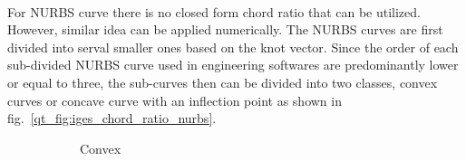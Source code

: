 \paragraph{}
For NURBS curve there is no closed form chord ratio that can be utilized.
However, similar idea can be applied numerically.
The NURBS curves are first divided into serval smaller ones based on the knot vector.  %
Since the order of each sub-divided NURBS curve used in engineering softwares are predominantly lower or equal to three, the sub-curves then can be divided into two classes, convex curves or concave curve with an inflection point as shown in fig.~\ref{qt_fig:iges_chord_ratio_nurbs}.
    \begin{figure}
        \begin{subfigure}[b]{0.5\linewidth}
            \centering
            \caption{Convex}
        \end{subfigure}
        \begin{subfigure}[b]{0.5\linewidth}
            \centering
\end{subfigure}
\end{figure}
